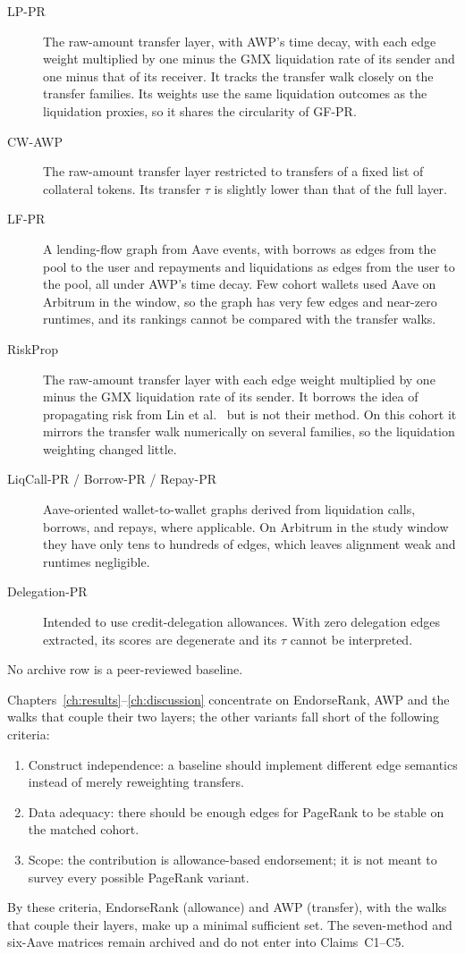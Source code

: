 \begin{description}
\item[LP-PR] The raw-amount transfer layer, with AWP's time decay, with each edge weight multiplied by one minus the GMX liquidation rate of its sender and one minus that of its receiver. It tracks the transfer walk closely on the transfer families. Its weights use the same liquidation outcomes as the liquidation proxies, so it shares the circularity of GF-PR.
\item[CW-AWP] The raw-amount transfer layer restricted to transfers of a fixed list of collateral tokens. Its transfer $\tau$ is slightly lower than that of the full layer.
\item[LF-PR] A lending-flow graph from Aave events, with borrows as edges from the pool to the user and repayments and liquidations as edges from the user to the pool, all under AWP's time decay. Few cohort wallets used Aave on Arbitrum in the window, so the graph has very few edges and near-zero runtimes, and its rankings cannot be compared with the transfer walks.
\item[RiskProp] The raw-amount transfer layer with each edge weight multiplied by one minus the GMX liquidation rate of its sender. It borrows the idea of propagating risk from Lin et al.~ but is not their method. On this cohort it mirrors the transfer walk numerically on several families, so the liquidation weighting changed little.
\item[LiqCall-PR / Borrow-PR / Repay-PR] Aave-oriented wallet-to-wallet graphs derived from liquidation calls, borrows, and repays, where applicable. On Arbitrum in the study window they have only tens to hundreds of edges, which leaves alignment weak and runtimes negligible.
\item[Delegation-PR] Intended to use credit-delegation allowances. With zero delegation edges extracted, its scores are degenerate and its $\tau$ cannot be interpreted.
\end{description}

No archive row is a peer-reviewed baseline.


Chapters~\ref{ch:results}--\ref{ch:discussion} concentrate on EndorseRank, AWP and the walks that couple their two layers; the other variants fall short of the following criteria:

\begin{enumerate}
\item Construct independence: a baseline should implement different edge semantics instead of merely reweighting transfers.
\item Data adequacy: there should be enough edges for PageRank to be stable on the matched cohort.
\item Scope: the contribution is allowance-based endorsement; it is not meant to survey every possible PageRank variant.
\end{enumerate}

By these criteria, EndorseRank (allowance) and AWP (transfer), with the walks that couple their layers, make up a minimal sufficient set. The seven-method and six-Aave matrices remain archived and do not enter into Claims~C1--C5.

